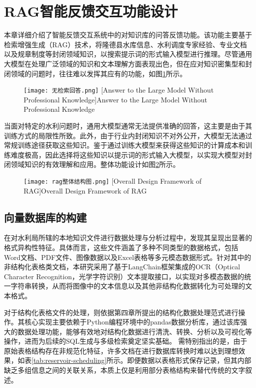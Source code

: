 \section{RAG智能反馈交互功能设计}
本章详细介绍了智能反馈交互系统中的对知识库的问答反馈功能。该功能主要基于检索增强生成（RAG）技术，将隆德县水库信息、水利调度专家经验、专业文档以及规章制度等封闭领域知识，以搜索提示词的形式输入模型进行推理。尽管通用大模型在处理广泛领域的知识和文本理解方面表现出色，但在应对知识密集型和封闭领域的问题时，往往难以发挥其应有的功能，如图\ref{fig:无检索}所示。
\begin{figure}[!htb]
    \centering
    \texttt{[image: 无检索回答.png]}
    [Answer to the Large Model Without Professional Knowledge]{Answer to the Large Model Without Professional Knowledge}
    \label{fig:无检索}
\end{figure}
当面对特定的水利问题时，通用大模型通常无法提供准确的回答，这主要是由于其训练方式的局限性所致。此外，由于行业内封闭知识不对外公开，大模型无法通过常规训练途径获取这些知识。鉴于通过训练大模型来获得这些知识的计算成本和训练难度极高，因此选择将这些知识以提示词的形式输入大模型，以实现大模型对封闭领域知识的有效理解和应用。整体功能设计如图\ref{fig:rag整体结构图}所示。
\begin{figure}[h]
    \centering
    \texttt{[image: rag整体结构图.png]}
    [Overall Design Framework of RAG]{Overall Design Framework of RAG}
    \label{fig:rag整体结构图}
\end{figure}
\subsection{向量数据库的构建}
在对水利局所辖的本地知识文件进行数据处理与分析过程中，发现其呈现出显著的格式异构性特征。具体而言，这些文件涵盖了多种不同类型的数据格式，包括Word文档、PDF文件、图像数据以及Excel表格等多元模态数据形式。针对其中的非结构化表格类文档，本研究采用了基于LangChain框架集成的OCR\cite{sarzynska-wawerDetectingFormalThought2021,tianDetectingTextNatural2016}（Optical Character Recognition，光学字符识别）文本提取接口，以实现对多模态数据的统一字符串转换，从而将图像中的文本信息以及其他非结构化数据转化为可处理的文本格式。

对于结构化表格文件的处理，则依据第四章所提出的结构化数据处理范式进行操作。其核心实现主要依赖于Python编程环境中的pandas数据分析库，通过该库强大的数据处理功能，能够有效地对结构化数据进行清洗、转换、分析以及可视化等操作，进而为后续的SQL生成与多级检索奠定坚实基础。
需特别指出的是，由于原始表格结构存在非规范化特征，许多文档在进行数据库转换时难以达到理想效果，如表\ref{tab:reservoir-scheduling}所示。即便数据以表格形式保存记录，但其内部缺乏多组信息之间的关联关系，本质上仅是利用部分表格结构来替代传统的文字叙述。

